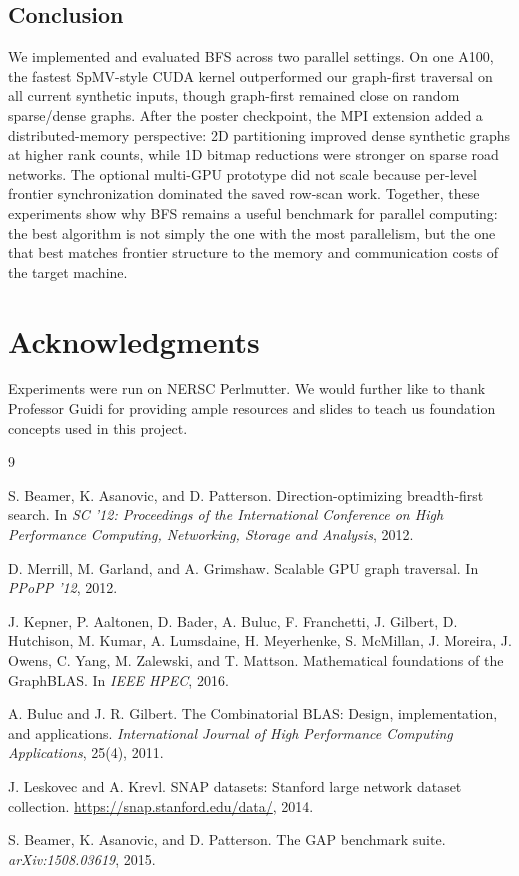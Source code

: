 \documentclass[11pt]{article}
\begin{document}
\subsection{Conclusion}

We implemented and evaluated BFS across two parallel settings. On one A100,
the fastest SpMV-style CUDA kernel outperformed our graph-first traversal on
all current synthetic inputs, though graph-first remained close on random
sparse/dense graphs. After the poster checkpoint, the MPI extension added a
distributed-memory perspective: 2D partitioning improved dense synthetic graphs
at higher rank counts, while 1D bitmap reductions were stronger on sparse road
networks. The optional multi-GPU prototype did not scale because per-level
frontier synchronization dominated the saved row-scan work. Together, these
experiments show why BFS remains a useful benchmark for parallel computing:
the best algorithm is not simply the one with the most parallelism, but the one
that best matches frontier structure to the memory and communication costs of
the target machine.

\section*{Acknowledgments}
Experiments were run on NERSC Perlmutter. We would further like to thank
Professor Guidi for providing ample resources and slides to teach us foundation
concepts used in this project.

\begin{thebibliography}{9}

S. Beamer, K. Asanovic, and D. Patterson.
\newblock Direction-optimizing breadth-first search.
\newblock In \emph{SC '12: Proceedings of the International Conference on High
Performance Computing, Networking, Storage and Analysis}, 2012.

D. Merrill, M. Garland, and A. Grimshaw.
\newblock Scalable GPU graph traversal.
\newblock In \emph{PPoPP '12}, 2012.

J. Kepner, P. Aaltonen, D. Bader, A. Buluc, F. Franchetti, J. Gilbert,
D. Hutchison, M. Kumar, A. Lumsdaine, H. Meyerhenke, S. McMillan,
J. Moreira, J. Owens, C. Yang, M. Zalewski, and T. Mattson.
\newblock Mathematical foundations of the GraphBLAS.
\newblock In \emph{IEEE HPEC}, 2016.

A. Buluc and J. R. Gilbert.
\newblock The Combinatorial BLAS: Design, implementation, and applications.
\newblock \emph{International Journal of High Performance Computing
Applications}, 25(4), 2011.

J. Leskovec and A. Krevl.
\newblock SNAP datasets: Stanford large network dataset collection.
\newblock \url{https://snap.stanford.edu/data/}, 2014.

S. Beamer, K. Asanovic, and D. Patterson.
\newblock The GAP benchmark suite.
\newblock \emph{arXiv:1508.03619}, 2015.

\end{thebibliography}
\end{document}
